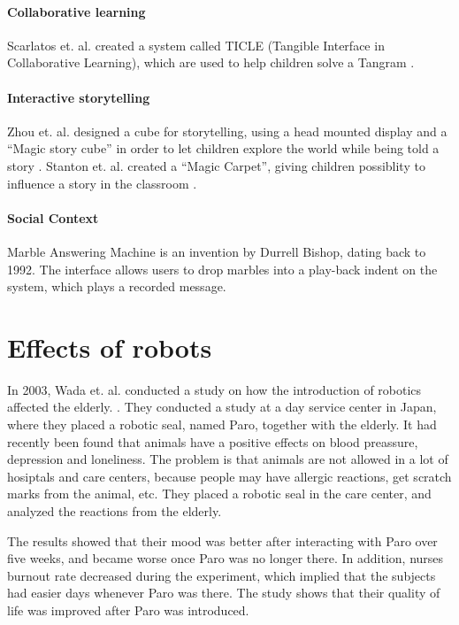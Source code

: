 \paragraph{Collaborative learning}
Scarlatos et. al. created a system called TICLE (Tangible Interface in Collaborative Learning), which are used to help children solve a Tangram \cite{scarlatos1999ticle}.  

\paragraph{Interactive storytelling}
Zhou et. al. designed a cube for storytelling, using a head mounted display and a ``Magic story cube'' in order to let children explore the world while being told a story \cite{zhou2004magic}. Stanton et. al. created a ``Magic Carpet'', giving children possiblity to influence a story in the classroom \cite{stanton2001classroom}. 
 
\paragraph{Social Context}
Marble Answering Machine is an invention by Durrell Bishop, dating back to 1992. The interface allows users to drop marbles into a play-back indent on the system, which plays a recorded message.   

\section{Effects of robots}

In 2003, Wada et. al. conducted a study on how the introduction of robotics affected the elderly. \cite{wada2004effects}. They conducted a study at a day service center in Japan, where they placed a robotic seal, named Paro, together with the elderly. It had recently been found that animals have a positive effects on blood preassure, depression and loneliness. The problem is that animals are not allowed in a lot of hosiptals and care centers, because people may have allergic reactions, get scratch marks from the animal, etc. They placed a robotic seal in the care center, and analyzed the reactions from the elderly. 

The results showed that their mood was better after interacting with Paro over five weeks, and became worse once Paro was no longer there. In addition, nurses burnout rate decreased during the experiment, which implied that the subjects had easier days whenever Paro was there. The study shows that their quality of life was improved after Paro was introduced.           


